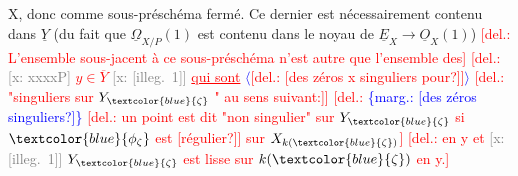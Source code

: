 \documentclass[11pt]{article}
\newcommand{\scanpage}[1]{\par\bigskip\noindent{\small\sffamily[scan #1]}\par}
\newcommand{\mspage}[1]{{\small\sffamily[p.\,#1]}}
\newcommand{\hand}[1]{\textcolor{blue}{#1}}
\newcommand{\inserted}[2][]{\textcolor{blue}{$\langle$#2$\rangle$}}
\newcommand{\margin}[1]{\textcolor{blue}{\{\textsf{marg.:} #1\}}}
\newcommand{\deleted}[1]{\textcolor{red}{[\textsf{del.:} #1]}}
\newcommand{\xout}[1]{\textcolor{gray}{[\textsf{x:} #1]}}
\newcommand{\uline}[1]{\underline{#1}}
\newcommand{\unsure}[1]{[#1?]}
\newcommand{\illegible}[1]{[\textsf{illeg.\ #1}]}
\begin{document}
X, donc comme sous-préschéma fermé. Ce dernier est nécessairement contenu
dans $\underline{Y}$  (du fait que $\underline{\Omega}_{X/P}(1)$  est contenu dans le noyau de  $\underline{E}_X\to\underline{O}_X(1)$)
\deleted{L'ensemble sous-jacent  à ce sous-préschéma n'est autre que l'ensemble des}
\deleted{\xout{xxxxP} $y\in\overline{Y}$ \xout{\illegible{1}} \uline{qui sont} \inserted{\deleted{\unsure{des zéros x singuliers pour}}} \deleted{"singuliers sur $Y_{\hand{\zeta}}$ " au sens suivant:}}
\deleted{\margin{\unsure{des zéros singuliers}} \deleted{un point est dit "non singulier" sur $Y_{\hand{\zeta}}$ si $\hand{\phi_\zeta}$ est \unsure{régulier}} sur $X_{k(\hand{\zeta})}$}
\deleted{en y et \xout{\illegible{1}} $Y_{\hand{\zeta}}$ est lisse sur $k(\hand{\zeta})$ en y.}

\mspage{\hand{37}}

\clearpage
\scanpage{25/38}
\mspage{\hand{34}}
\end{document}

